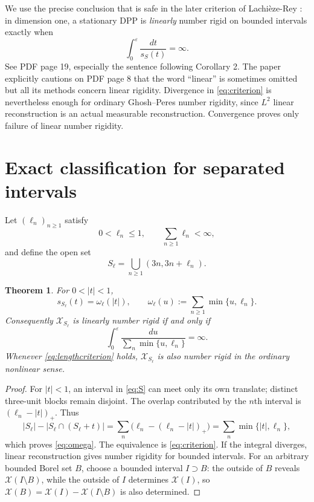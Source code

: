 \documentclass[11pt]{article}
\newtheorem{theorem}{Theorem}
\newcommand{\D}{\mathcal X}
\begin{document}
We use the precise conclusion that is safe in the later criterion of
Lachi\`eze-Rey \cite{linear}: in dimension one, a stationary DPP is
\emph{linearly} number rigid on bounded intervals exactly when
\begin{equation}\label{eq:criterion}
 \int_{0}^{\varepsilon}\frac{dt}{s_S(t)}=\infty.
\end{equation}
See PDF page 19, especially the sentence following Corollary 2.  The paper
explicitly cautions on PDF page 8 that the word ``linear'' is sometimes
omitted but all its methods concern linear rigidity.  Divergence in
\eqref{eq:criterion} is nevertheless enough for ordinary Ghosh--Peres number
rigidity, since $L^2$ linear reconstruction is an actual measurable
reconstruction.  Convergence proves only failure of linear number rigidity.

\section*{Exact classification for separated intervals}

Let $(\ell_n)_{n\geq1}$ satisfy
\[
 0<\ell_n\leq1,\qquad \sum_{n\geq1}\ell_n<\infty,
\]
and define the open set
\begin{equation}\label{eq:S}
 S_{\ell}=\bigcup_{n\geq1}(3n,3n+\ell_n).
\end{equation}

\begin{theorem}\label{thm:classification}
For $0<|t|<1$,
\begin{equation}\label{eq:omega}
 s_{S_{\ell}}(t)=\omega_{\ell}(|t|),\qquad
 \omega_{\ell}(u):=\sum_{n\geq1}\min\{u,\ell_n\}.
\end{equation}
Consequently $\D_{S_{\ell}}$ is linearly number rigid if and only if
\begin{equation}\label{eq:lengthcriterion}
 \int_0^\varepsilon\frac{du}{\sum_n\min\{u,\ell_n\}}=\infty.
\end{equation}
Whenever \eqref{eq:lengthcriterion} holds, $\D_{S_{\ell}}$ is also number
rigid in the ordinary nonlinear sense.
\end{theorem}

\begin{proof}
For $|t|<1$, an interval in \eqref{eq:S} can meet only its own translate;
distinct three-unit blocks remain disjoint.  The overlap contributed by the
$n$th interval is $(\ell_n-|t|)_+$.  Thus
\[
 |S_{\ell}|-|S_{\ell}\cap(S_{\ell}+t)|
 =\sum_n\bigl(\ell_n-(\ell_n-|t|)_+\bigr)
 =\sum_n\min\{|t|,\ell_n\},
\]
which proves \eqref{eq:omega}.  The equivalence is \eqref{eq:criterion}.
If the integral diverges, linear reconstruction gives number rigidity for
bounded intervals.  For an arbitrary bounded Borel set $B$, choose a bounded
interval $I\supset B$: the outside of $B$ reveals $\D(I\setminus B)$, while
the outside of $I$ determines $\D(I)$, so
$\D(B)=\D(I)-\D(I\setminus B)$ is also determined.
\end{proof}
\end{document}
